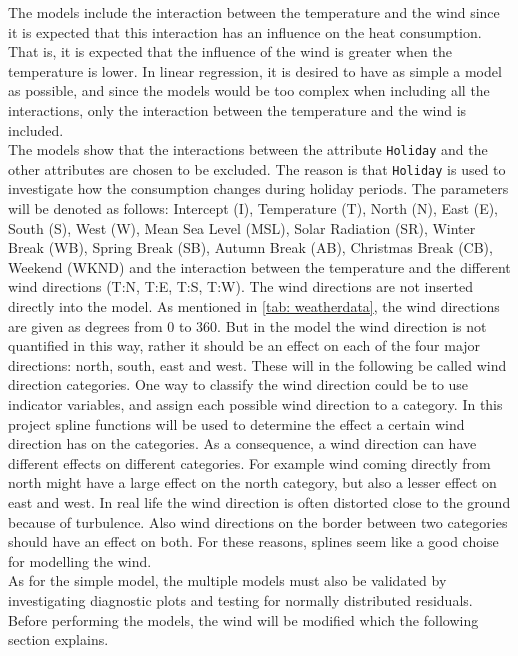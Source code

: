 The models include the interaction between the temperature and the wind since it is expected that this interaction has an influence on the heat consumption. That is, it is expected that the influence of the wind is greater when the temperature is lower. In linear regression, it is desired to have as simple a model as possible, and since the models would be too complex when including all the interactions, only the interaction between the temperature and the wind is included.\\

\noindent The models show that the interactions between the attribute \texttt{Holiday} and the other attributes are chosen to be excluded. The reason is that \texttt{Holiday} is used to investigate how the consumption changes during holiday periods. The parameters will be denoted as follows: Intercept (I), Temperature (T), North (N), East (E), South (S), West (W), Mean Sea Level (MSL), Solar Radiation (SR), Winter Break (WB), Spring Break (SB), Autumn Break (AB), Christmas Break (CB), Weekend (WKND) and the interaction between the temperature and the different wind directions (T:N, T:E, T:S, T:W). The wind directions are not inserted directly into the model. As mentioned in \cref{tab: weatherdata}, the wind directions are given as degrees from $0$ to $360$. But in the model the wind direction is not quantified in this way, rather it should be an effect on each of the four major directions: north, south, east and west. These will in the following be called wind direction categories. One way to classify the wind direction could be to use indicator variables, and assign each possible wind direction to a category. In this project spline functions will be used to determine the effect a certain wind direction has on the categories. As a consequence, a wind direction can have different effects on different categories. For example wind coming directly from north might have a large effect on the north category, but also a lesser effect on east and west. In real life the wind direction is often distorted close to the ground because of turbulence. Also wind directions on the border between two categories should have an effect on both. For these reasons, splines seem like a good choise for modelling the wind. \\

\noindent As for the simple model, the multiple models must also be validated by investigating diagnostic plots and testing for normally distributed residuals. Before performing the models, the wind will be modified which the following section explains.

